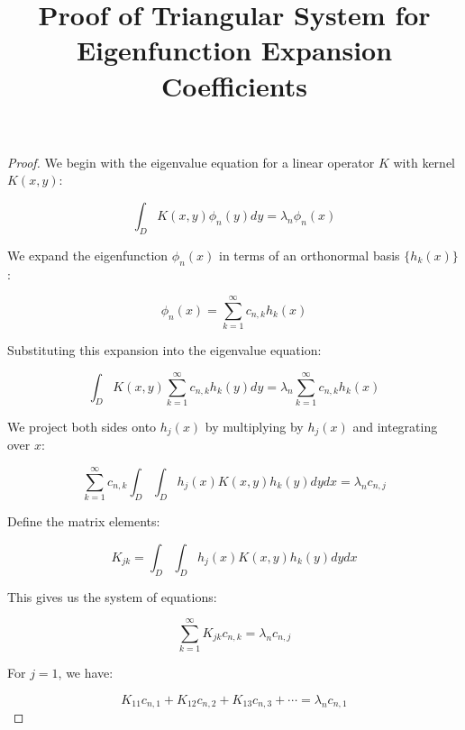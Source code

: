 \documentclass{article}
\begin{document}
\title{Proof of Triangular System for Eigenfunction Expansion Coefficients}
\author{}
\date{}

\maketitle

\begin{proof}
We begin with the eigenvalue equation for a linear operator $K$ with kernel $K(x,y)$:

\begin{equation}
    \int_D K(x,y)\phi_n(y)dy = \lambda_n\phi_n(x)
\end{equation}

We expand the eigenfunction $\phi_n(x)$ in terms of an orthonormal basis $\{h_k(x)\}$:

\begin{equation}
    \phi_n(x) = \sum_{k=1}^{\infty} c_{n,k} h_k(x)
\end{equation}

Substituting this expansion into the eigenvalue equation:

\begin{equation}
    \int_D K(x,y)\sum_{k=1}^{\infty} c_{n,k} h_k(y)dy = \lambda_n\sum_{k=1}^{\infty} c_{n,k} h_k(x)
\end{equation}

We project both sides onto $h_j(x)$ by multiplying by $h_j(x)$ and integrating over $x$:

\begin{equation}
    \sum_{k=1}^{\infty} c_{n,k} \int_D\int_D h_j(x)K(x,y)h_k(y)dydx = \lambda_n c_{n,j}
\end{equation}

Define the matrix elements:

\begin{equation}
    K_{jk} = \int_D\int_D h_j(x)K(x,y)h_k(y)dydx
\end{equation}

This gives us the system of equations:

\begin{equation}
    \sum_{k=1}^{\infty} K_{jk} c_{n,k} = \lambda_n c_{n,j}
\end{equation}

For $j = 1$, we have:

\begin{equation}
    K_{11}c_{n,1} + K_{12}c_{n,2} + K_{13}c_{n,3} + \cdots = \lambda_n c_{n,1}
\end{equation}


\end{proof}
\end{document}
